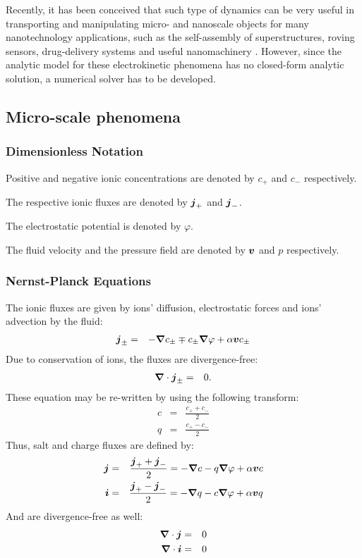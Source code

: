 Recently, it has been conceived that such type of dynamics
can be very useful in transporting and manipulating micro-
and nanoscale objects for many nanotechnology applications,
such as the self-assembly of superstructures, roving sensors, 
drug-delivery systems and useful nanomachinery 
\cite{pumera2010electrochemically,paxton2004catalytic,howse2007self}.
However, since the analytic model for these electrokinetic
phenomena has no closed-form analytic solution, a numerical
solver has to be developed.



\subsection{Micro-scale phenomena}

\subsubsection{Dimensionless Notation}
Positive and negative ionic concentrations are denoted by $c_+$ and $c_-$ respectively.

The respective ionic fluxes are denoted by $\boldsymbol{j}_+$ and $\boldsymbol{j}_-$.

The electrostatic potential is denoted by $\varphi$. 

The fluid velocity and the pressure field are denoted by $\boldsymbol{v}$ and $p$ respectively.

\subsubsection{Nernst-Planck Equations}
The ionic fluxes are given by ions' diffusion, electrostatic forces and ions' advection by the fluid:
\begin{eqnarray}
  \boldsymbol{j}_\pm &=& -\boldsymbol{\nabla} c_\pm \mp c_\pm \boldsymbol{\nabla} \varphi + \alpha \boldsymbol{v} c_\pm
\end{eqnarray}
Due to conservation of ions, the fluxes are divergence-free:
\begin{eqnarray}
\boldsymbol{\nabla} \cdot \boldsymbol{j}_\pm &=& 0.
\end{eqnarray}
These equation may be re-written by using the following transform:
\begin{eqnarray}
  c &=& \frac{c_+ + c_-}{2}\\
  q &=& \frac{c_+ - c_-}{2}
\end{eqnarray}
Thus, salt and charge fluxes are defined by:
\begin{eqnarray}
  \boldsymbol{j} &=& \frac{\boldsymbol{j}_+ + \boldsymbol{j}_-}{2} = -\boldsymbol{\nabla} c - q \boldsymbol{\nabla} \varphi + \alpha \boldsymbol{v} c \\
  \boldsymbol{i} &=& \frac{\boldsymbol{j}_+ - \boldsymbol{j}_-}{2} = -\boldsymbol{\nabla} q - c \boldsymbol{\nabla} \varphi + \alpha \boldsymbol{v} q
\end{eqnarray}
And are divergence-free as well:
\begin{eqnarray}
\boldsymbol{\nabla} \cdot \boldsymbol{j} &=& 0 \\
\boldsymbol{\nabla} \cdot \boldsymbol{i} &=& 0 
\end{eqnarray}

